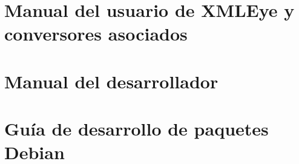 \documentclass[a4paper,12pt,titlepage,halfparskip,cleardoubleempty]{scrbook}
\begin{document}
\chapter{Manual del usuario de XMLEye y conversores asociados}

 
\chapter{Manual del desarrollador}


\appendix

\chapter{Guía de desarrollo de paquetes Debian}







\printindex
\end{document}
